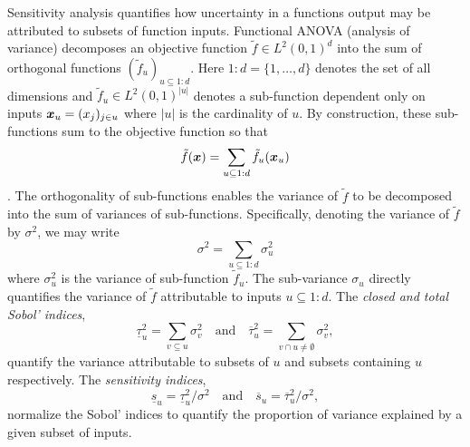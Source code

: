 \documentclass{article}[12pt]
\begin{document}
Sensitivity analysis quantifies how uncertainty in a functions output may be attributed to subsets of function inputs. Functional ANOVA (analysis of variance) decomposes an objective function $\tilde{f} \in L^2(0,1)^{d}$ into the sum of orthogonal functions $(\tilde{f}_u)_{u \subseteq 1:d}$. Here $1:d=\{1,\dots,d\}$ denotes the set of all dimensions and $\tilde{f}_u \in L^2(0,1)^{\lvert u \rvert}$ denotes a sub-function dependent only on inputs $\boldsymbol{x}_u = (x_j)_{j \in u}$ where $\lvert u \rvert$ is the cardinality of $u$. By construction, these sub-functions sum to the objective function so that
\begin{equation}
    \tilde{f}(\boldsymbol{x}) = \sum_{u \subseteq 1:d} \tilde{f}_u(\boldsymbol{x}_u) 
    \label{eq:fanova}
\end{equation}
\cite[Appendix A]{mcbook}. The orthogonality of sub-functions enables the variance of $\tilde{f}$ to be decomposed into the sum of variances of sub-functions. Specifically, denoting the variance of $\tilde{f}$ by $\sigma^2$, we may write
\begin{equation*}
    \sigma^2 = \sum_{u \subseteq 1:d} \sigma^2_u
\end{equation*}
where $\sigma^2_u$ is the variance of sub-function $\tilde{f}_u$. The sub-variance $\sigma_u$ directly quantifies the variance of $\tilde{f}$ attributable to inputs $u \subseteq 1:d$.  The \emph{closed and total Sobol' indices},
\begin{equation*}
    \underline{\tau}_u^2 = \sum_{v \subseteq u} \sigma^2_v \quad \text{and} \quad 
    \overline{\tau}_u^2 = \sum_{v \cap u \neq \emptyset} \sigma^2_v,
    \label{eq:sobol_indices}
\end{equation*}
quantify the variance attributable to subsets of $u$ and subsets containing $u$ respectively. The \emph{sensitivity indices},
\begin{equation*}
    \underline{s}_u = \underline{\tau}_u^2/\sigma^2 \quad \text{and} \quad 
    \overline{s}_u = \overline{\tau}_u^2/\sigma^2,
    \label{eq:sensitivity_indices_og}
\end{equation*}
normalize the Sobol' indices to quantify the proportion of variance explained by a given subset of inputs. 
\end{document}
